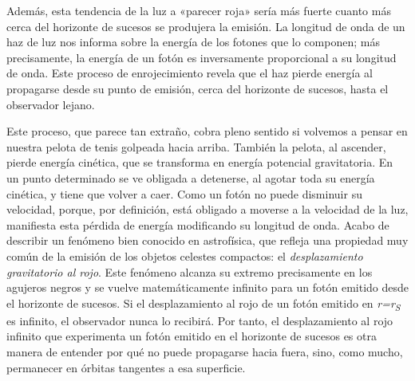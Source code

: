 Además, esta tendencia de la luz a «parecer roja» sería más fuerte cuanto más cerca del horizonte de sucesos se produjera la emisión. La longitud de onda de un haz de luz nos informa sobre la energía de los fotones que lo componen; más precisamente, la energía de un fotón es inversamente proporcional a su longitud de onda. Este proceso de enrojecimiento revela que el haz pierde energía al propagarse desde su punto de emisión, cerca del horizonte de sucesos, hasta el observador lejano.

Este proceso, que parece tan extraño, cobra pleno sentido si volvemos a pensar en nuestra pelota de tenis golpeada hacia arriba. También la pelota, al ascender, pierde energía cinética, que se transforma en energía potencial gravitatoria. En un punto determinado se ve obligada a detenerse, al agotar toda su energía cinética, y tiene que volver a caer. Como un fotón no puede disminuir su velocidad, porque, por definición, está obligado a moverse a la velocidad de la luz, manifiesta esta pérdida de energía modificando su longitud de onda. Acabo de describir un fenómeno bien conocido en astrofísica, que refleja una propiedad muy común de la emisión de los objetos celestes compactos: el \emph{desplazamiento gravitatorio al rojo}. Este fenómeno alcanza su extremo precisamente en los agujeros negros y se vuelve matemáticamente infinito para un fotón emitido desde el horizonte de sucesos. Si el desplazamiento al rojo de un fotón emitido en \emph{r=r\textsubscript{S}} es infinito, el observador nunca lo recibirá. Por tanto, el desplazamiento al rojo infinito que experimenta un fotón emitido en el horizonte de sucesos es otra manera de entender por qué no puede propagarse hacia fuera, sino, como mucho, permanecer en órbitas tangentes a esa superficie.

